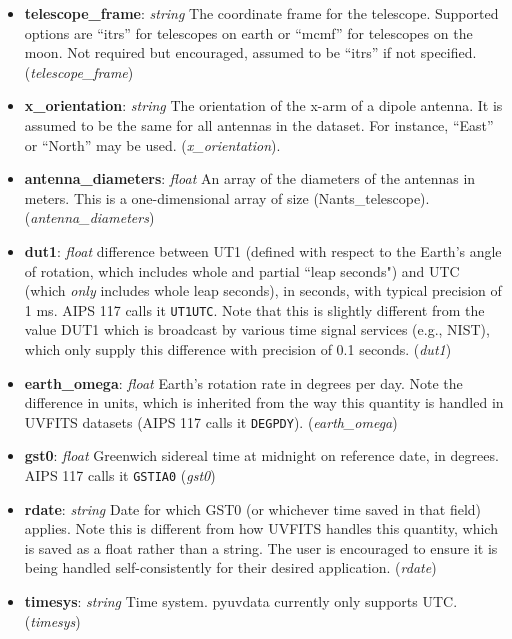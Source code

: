 \documentclass[11pt, oneside]{article}
\begin{document}
\begin{itemize}
\item \textbf{telescope\_frame}: \textit{string}  The coordinate frame for the telescope.
  Supported options are ``itrs'' for telescopes on earth or ``mcmf'' for telescopes
  on the moon. Not required but encouraged, assumed to be ``itrs'' if not specified.
  (\textit{telescope\_frame})
\item \textbf{x\_orientation}: \textit{string} The orientation of the x-arm of a
  dipole antenna. It is assumed to be the same for all antennas in the
  dataset. For instance, ``East'' or ``North'' may be used.
  (\textit{x\_orientation}).
\item \textbf{antenna\_diameters}: \textit{float} An array of the diameters of
  the antennas in meters. This is a one-dimensional array of size
  (Nants\_telescope). (\textit{antenna\_diameters})
  
\item \textbf{dut1}: \textit{float} difference between UT1 (defined with respect to the
  Earth's angle of rotation, which includes whole and partial ``leap seconds") and UTC
  (which \emph{only} includes whole leap seconds), in seconds, with typical precision of
  1 ms. AIPS 117 calls it \verb+UT1UTC+. Note that this is slightly different from
  the value DUT1 which is broadcast by various time signal services (e.g., NIST), which
  only supply this difference with precision of 0.1 seconds. (\textit{dut1})
\item \textbf{earth\_omega}: \textit{float} Earth's rotation rate in degrees per
  day. Note the difference in units, which is inherited from the way this
  quantity is handled in UVFITS datasets (AIPS 117 calls it \verb+DEGPDY+).
  (\textit{earth\_omega})
\item \textbf{gst0}: \textit{float} Greenwich sidereal time at midnight on
  reference date, in degrees. AIPS 117 calls it \verb+GSTIA0+ (\textit{gst0})
\item \textbf{rdate}: \textit{string} Date for which GST0 (or whichever time
  saved in that field) applies. Note this is different from how UVFITS handles
  this quantity, which is saved as a float rather than a string. The user is
  encouraged to ensure it is being handled self-consistently for their desired
  application. (\textit{rdate})
\item \textbf{timesys}: \textit{string} Time system. pyuvdata currently only
  supports UTC. (\textit{timesys})


\end{itemize}
\end{document}
